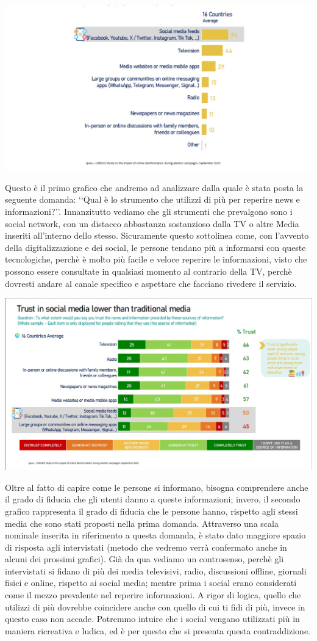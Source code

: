 \documentclass{article}
\begin{document}
\centering\includegraphics[width=0.6\linewidth]{Immagini/Grafico1.jpg}\\
    \begin{justify}
    Questo è il primo grafico che andremo ad analizzare dalla quale è stata posta la seguente domanda: ‘‘Qual è lo strumento che utilizzi di più per reperire news e informazioni?’’.
    Innanzitutto vediamo che gli strumenti che prevalgono sono i social network, con un distacco abbastanza sostanzioso dalla TV o altre Media inseriti all'interno dello stesso. Sicuramente questo sottolinea come, con l'avvento della digitalizzazione e dei social, le persone tendano più a informarsi con queste tecnologiche, perchè è molto più facile e veloce reperire le informazioni, visto che possono essere consultate in qualsiasi momento al contrario della TV, perchè dovresti andare al canale specifico e aspettare che facciano rivedere il servizio.
    
\begin{center}
\includegraphics[width=0.6\linewidth]{Immagini/Grafico2.jpg}\\
\end{center}
    Oltre al fatto di capire come le persone si informano, bisogna comprendere anche il grado di fiducia che gli utenti danno a queste informazioni; invero, il secondo grafico rappresenta il grado di fiducia che le persone hanno, rispetto agli stessi media che sono stati proposti nella prima domanda.
    Attraverso una scala nominale inserita in riferimento a questa domanda, è stato dato maggiore spazio di risposta agli intervistati (metodo che vedremo verrà confermato anche in alcuni dei prossimi grafici).
    Già da qua vediamo un controsenso, perchè gli intervistati si fidano di più dei media televisivi, radio, discussioni offline, giornali fisici e online, rispetto ai social media; mentre prima i social erano considerati come il mezzo prevalente nel reperire informazioni. A rigor di logica, quello che utilizzi di più dovrebbe coincidere anche con quello di cui ti fidi di più, invece in questo caso non accade. Potremmo intuire che i social vengano utilizzati più in maniera ricreativa e ludica, ed è per questo che si presenta questa contraddizione.
    

\end{justify}
\end{document}
